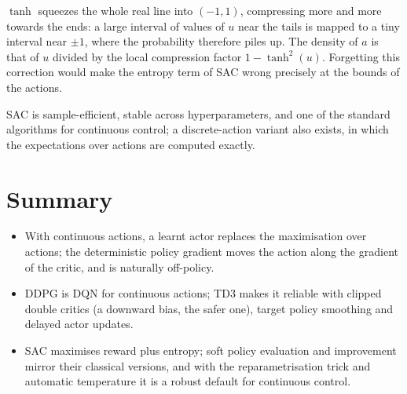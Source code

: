 \begin{intuition}
  $\tanh$ squeezes the whole real line into $(-1, 1)$, compressing more and
  more towards the ends: a large interval of values of $u$ near the tails is
  mapped to a tiny interval near $\pm 1$, where the probability therefore
  piles up. The density of $a$ is that of $u$ divided by the local
  compression factor $1 - \tanh^2(u)$. Forgetting this correction would make
  the entropy term of SAC wrong precisely at the bounds of the actions.
\end{intuition}

SAC is sample-efficient, stable across hyperparameters, and one of the
standard algorithms for continuous control; a discrete-action variant also
exists, in which the expectations over actions are computed exactly.

\section{Summary}

\begin{itemize}[nosep]
  \item With continuous actions, a learnt actor replaces the maximisation
    over actions; the deterministic policy gradient moves the action along
    the gradient of the critic, and is naturally off-policy.
  \item DDPG is DQN for continuous actions; TD3 makes it reliable with
    clipped double critics (a downward bias, the safer one), target policy
    smoothing and delayed actor updates.
  \item SAC maximises reward plus entropy; soft policy evaluation and
    improvement mirror their classical versions, and with the
    reparametrisation trick and automatic temperature it is a robust
    default for continuous control.
\end{itemize}
